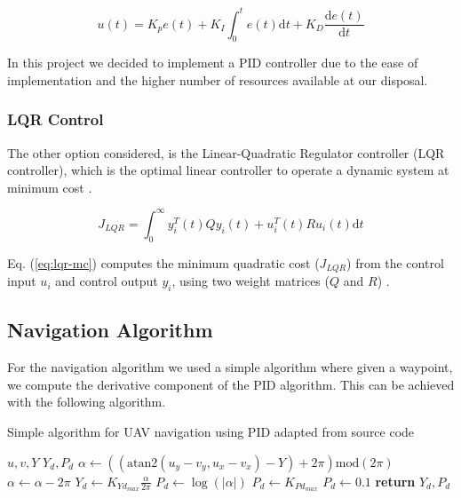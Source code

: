 \begin{equation}
	u(t) = K_p e(t) + K_I \int^t_0 e(t) \mathrm{d} t + K_D \frac{\mathrm{d} e(t)}{\mathrm{d}t}
	\label{eq:pid-u}
\end{equation}

In this project we decided to implement a PID controller due to the ease of implementation and the 
higher number of resources available at our disposal.

\subsubsection{LQR Control}

The other option considered, is the Linear-Quadratic Regulator controller (LQR controller), which is the 
optimal linear controller to operate a dynamic system at minimum cost \autocite{NH20}.

\begin{equation}
	J_{LQR} = \int^\infty_0 y_i^T(t) Q y_i (t) + u_i^T (t) R u_i (t) \mathrm{d}t
	\label{eq:lqr-mc}
\end{equation}

Eq. (\ref{eq:lqr-mc}) computes the minimum quadratic cost ($J_{LQR}$) from the control input $u_i$ and control
output $y_i$, using two weight matrices ($Q$ and $R$) \autocite{NH20}.

\subsection{Navigation Algorithm}

For the navigation algorithm we used a simple algorithm where given a waypoint, we compute the 
derivative component of the PID algorithm. This can be achieved with the following algorithm.

\begin{algorithm}
	\algrenewcommand{}
	\algrenewcommand{}
	\caption{Simple algorithm for UAV navigation using PID adapted from \autocite{CB23} source code}\label{alg:nav}
	\begin{algorithmic}[1]
		\Require $u, v, Y$
		\Ensure $Y_d, P_d$
		\State $\alpha \gets ((\mathrm{atan2}(u_y - v_y, u_x - v_x) - Y) + 2 \pi) \mathrm{mod} (2 \pi)$
		\If{$\alpha > \pi$ }
		\State $\alpha \gets \alpha - 2 \pi$
		\EndIf
		\State $Y_d \gets K_{Yd_{max}} \frac{\alpha}{2\pi}$
		\State $P_d \gets \log(|\alpha|)$
		\State $P_d \gets K_{Pd_{max}}$
		\State $P_d \gets 0.1$
		\EndIf
		\State \textbf{return} $Y_d, P_d$
	\end{algorithmic}
\end{algorithm}

